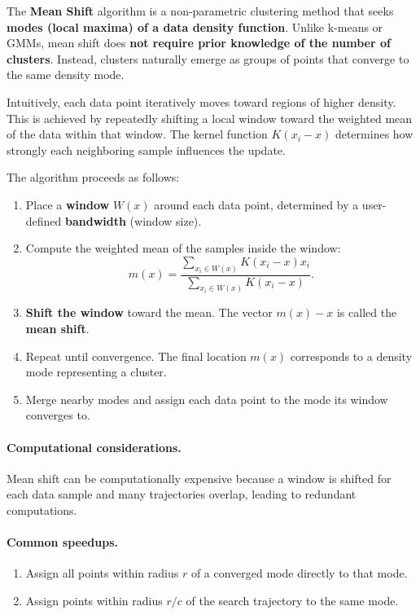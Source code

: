 \documentclass{article}
\begin{document}
The \textbf{Mean Shift} algorithm is a non-parametric clustering method that seeks 
\textbf{modes (local maxima) of a data density function}. Unlike k-means or GMMs, 
mean shift does \textbf{not require prior knowledge of the number of clusters}. 
Instead, clusters naturally emerge as groups of points that converge to the same 
density mode.

Intuitively, each data point iteratively moves toward regions of higher density. 
This is achieved by repeatedly shifting a local window toward the weighted mean of 
the data within that window. The kernel function $K(x_i - x)$ determines how strongly 
each neighboring sample influences the update.

The algorithm proceeds as follows:

\begin{enumerate}
    \item Place a \textbf{window} $W(x)$ around each data point, determined by a 
    user-defined \textbf{bandwidth} (window size).

    \item Compute the weighted mean of the samples inside the window:
    \[
    m(x)=\frac{\sum_{x_i\in W(x)} K(x_i-x)x_i}{\sum_{x_i\in W(x)} K(x_i-x)}.
    \]

    \item \textbf{Shift the window} toward the mean. The vector $m(x)-x$ is called 
    the \textbf{mean shift}.

    \item Repeat until convergence. The final location $m(x)$ corresponds to a 
    density mode representing a cluster.

    \item Merge nearby modes and assign each data point to the mode its window 
    converges to.
\end{enumerate}

\paragraph{Computational considerations.}
Mean shift can be computationally expensive because a window is shifted for each 
data sample and many trajectories overlap, leading to redundant computations.

\paragraph{Common speedups.}
\begin{enumerate}
    \item Assign all points within radius $r$ of a converged mode directly to that mode.
    \item Assign points within radius $r/c$ of the search trajectory to the same mode.
\end{enumerate}
\end{document}
